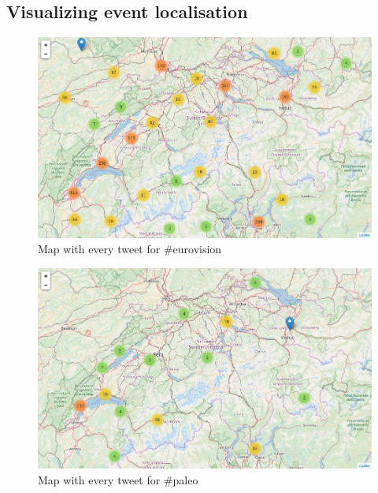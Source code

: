 \documentclass[11pt]{article}
\begin{document}
\subsection{Visualizing event localisation}

\begin{figure}[htbp]
  \vspace*{-1mm}
  \centering
  \includegraphics[width=\columnwidth]{figures/map_eurovision.png}
  \vspace{-5mm}
  \caption{Map with every tweet for \#eurovision}
  \label{fig:map_eurovision}
\end{figure}

\begin{figure}[htbp]
  \vspace*{-1mm}
  \centering
  \includegraphics[width=\columnwidth]{figures/map_paleo.png}
  \vspace{-5mm}
  \caption{Map with every tweet for \#paleo}
  \label{fig:map_paleo}
\end{figure}
\end{document}

